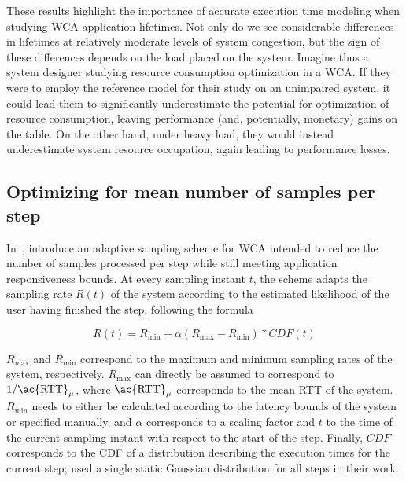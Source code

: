 These results highlight the importance of accurate execution time modeling when studying \ac{WCA} application lifetimes.
Not only do we see considerable differences in lifetimes at relatively moderate levels of system congestion, but the sign of these differences depends on the load placed on the system.
Imagine thus a system designer studying resource consumption optimization in a \ac{WCA}.
If they were to employ the reference model for their study on an unimpaired system, it could lead them to significantly underestimate the potential for optimization of resource consumption, leaving performance (and, potentially, monetary) gains on the table.
On the other hand, under heavy load, they would instead underestimate system resource occupation, again leading to performance losses.




\subsection{Optimizing for mean number of samples per step}

In~\cite{Wang2019Towards}, \citeauthor{Wang2019Towards} introduce an adaptive sampling scheme for \ac{WCA} intended to reduce the number of samples processed per step while still meeting application responsiveness bounds.
At every sampling instant \( t \), the scheme adapts the sampling rate \( R(t) \) of the system according to the estimated likelihood of the user having finished the step,
following the formula 

\begin{equation}
    R(t) = R_\text{min} + \alpha\left( R_\text{max} - R_\text{min} \right) * CDF(t)
\end{equation}

\( R_\text{max} \) and \( R_\text{min} \) correspond to the maximum and minimum sampling rates of the system, respectively.
\( R_\text{max} \) can directly be assumed to correspond to \( 1 / \text{\ac{RTT}}_\mu \), where \( \text{\ac{RTT}}_\mu \) corresponds to the mean \ac{RTT} of the system.
\( R_\text{min} \) needs to either be calculated according to the latency bounds of the system or specified manually, and \( \alpha \) corresponds to a scaling factor and \( t \) to the time of the current sampling instant with respect to the start of the step.
Finally, \( CDF \) corresponds to the \ac{CDF} of a distribution describing the execution times for the current step; \citeauthor{Wang2019Towards} used a single static Gaussian distribution for all steps in their work.

